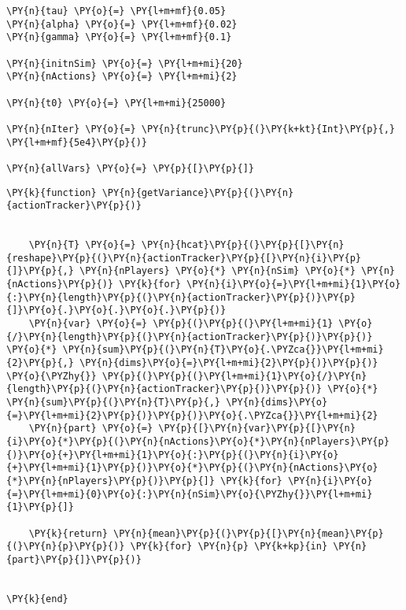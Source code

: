 \documentclass[main.tex]{subfiles}
\begin{document}
    \begin{tcolorbox}[breakable, size=fbox, boxrule=1pt, pad at break*=1mm,colback=cellbackground, colframe=cellborder]
\begin{Verbatim}[commandchars=\\\{\}]
\PY{n}{tau} \PY{o}{=} \PY{l+m+mf}{0.05}
\PY{n}{alpha} \PY{o}{=} \PY{l+m+mf}{0.02}
\PY{n}{gamma} \PY{o}{=} \PY{l+m+mf}{0.1}

\PY{n}{initnSim} \PY{o}{=} \PY{l+m+mi}{20}
\PY{n}{nActions} \PY{o}{=} \PY{l+m+mi}{2}

\PY{n}{t0} \PY{o}{=} \PY{l+m+mi}{25000}

\PY{n}{nIter} \PY{o}{=} \PY{n}{trunc}\PY{p}{(}\PY{k+kt}{Int}\PY{p}{,} \PY{l+m+mf}{5e4}\PY{p}{)}

\PY{n}{allVars} \PY{o}{=} \PY{p}{[}\PY{p}{]}
\end{Verbatim}
\end{tcolorbox}

    \begin{tcolorbox}[breakable, size=fbox, boxrule=1pt, pad at break*=1mm,colback=cellbackground, colframe=cellborder]
\begin{Verbatim}[commandchars=\\\{\}]
\PY{k}{function} \PY{n}{getVariance}\PY{p}{(}\PY{n}{actionTracker}\PY{p}{)}
    

    \PY{n}{T} \PY{o}{=} \PY{n}{hcat}\PY{p}{(}\PY{p}{[}\PY{n}{reshape}\PY{p}{(}\PY{n}{actionTracker}\PY{p}{[}\PY{n}{i}\PY{p}{]}\PY{p}{,} \PY{n}{nPlayers} \PY{o}{*} \PY{n}{nSim} \PY{o}{*} \PY{n}{nActions}\PY{p}{)} \PY{k}{for} \PY{n}{i}\PY{o}{=}\PY{l+m+mi}{1}\PY{o}{:}\PY{n}{length}\PY{p}{(}\PY{n}{actionTracker}\PY{p}{)}\PY{p}{]}\PY{o}{.}\PY{o}{.}\PY{o}{.}\PY{p}{)}
    \PY{n}{var} \PY{o}{=} \PY{p}{(}\PY{p}{(}\PY{l+m+mi}{1} \PY{o}{/}\PY{n}{length}\PY{p}{(}\PY{n}{actionTracker}\PY{p}{)}\PY{p}{)} \PY{o}{*} \PY{n}{sum}\PY{p}{(}\PY{n}{T}\PY{o}{.\PYZca{}}\PY{l+m+mi}{2}\PY{p}{,} \PY{n}{dims}\PY{o}{=}\PY{l+m+mi}{2}\PY{p}{)}\PY{p}{)} \PY{o}{\PYZhy{}} \PY{p}{(}\PY{p}{(}\PY{l+m+mi}{1}\PY{o}{/}\PY{n}{length}\PY{p}{(}\PY{n}{actionTracker}\PY{p}{)}\PY{p}{)} \PY{o}{*} \PY{n}{sum}\PY{p}{(}\PY{n}{T}\PY{p}{,} \PY{n}{dims}\PY{o}{=}\PY{l+m+mi}{2}\PY{p}{)}\PY{p}{)}\PY{o}{.\PYZca{}}\PY{l+m+mi}{2}
    \PY{n}{part} \PY{o}{=} \PY{p}{[}\PY{n}{var}\PY{p}{[}\PY{n}{i}\PY{o}{*}\PY{p}{(}\PY{n}{nActions}\PY{o}{*}\PY{n}{nPlayers}\PY{p}{)}\PY{o}{+}\PY{l+m+mi}{1}\PY{o}{:}\PY{p}{(}\PY{n}{i}\PY{o}{+}\PY{l+m+mi}{1}\PY{p}{)}\PY{o}{*}\PY{p}{(}\PY{n}{nActions}\PY{o}{*}\PY{n}{nPlayers}\PY{p}{)}\PY{p}{]} \PY{k}{for} \PY{n}{i}\PY{o}{=}\PY{l+m+mi}{0}\PY{o}{:}\PY{n}{nSim}\PY{o}{\PYZhy{}}\PY{l+m+mi}{1}\PY{p}{]}

    \PY{k}{return} \PY{n}{mean}\PY{p}{(}\PY{p}{[}\PY{n}{mean}\PY{p}{(}\PY{n}{p}\PY{p}{)} \PY{k}{for} \PY{n}{p} \PY{k+kp}{in} \PY{n}{part}\PY{p}{]}\PY{p}{)}

    
\PY{k}{end}
\end{Verbatim}
\end{tcolorbox}
\end{document}
